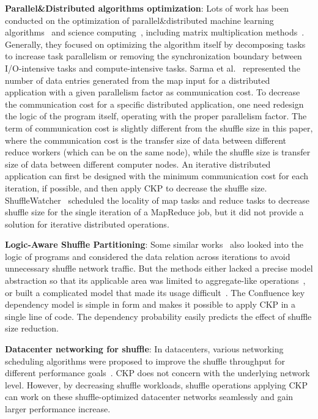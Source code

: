 \documentclass[10pt,journal,compsoc]{IEEEtran}
\begin{document}
\textbf{Parallel\&Distributed algorithms optimization}: Lots of work has been conducted on the optimization of parallel\&distributed machine learning algorithms~\cite{bekkerman2011scaling} and science computing~\cite{kiran2013verification, mensink2012metric}, including matrix multiplication methods~\cite{buluc2012parallel, ballard2012communication}. 
Generally, they focused on optimizing the algorithm itself by decomposing tasks to increase task parallelism or removing the synchronization boundary between I/O-intensive tasks and compute-intensive tasks. 
Sarma et al.~\cite{Sarma:2013:ULB} represented the number of data entries generated from the map input for a distributed application with a given parallelism factor as communication cost. 
To decrease the communication cost for a specific distributed application, one need redesign the logic of the program itself, operating with the proper parallelism factor. 
The term of communication cost is slightly different from the shuffle size in this paper, where the communication cost is the transfer size of data between different reduce workers (which can be on the same node), while the shuffle size is transfer size of data between different computer nodes. 
An iterative distributed application can first be designed with the minimum communication cost for each iteration, if possible, and then apply CKP to decrease the shuffle size.
ShuffleWatcher~\cite{faraz2014shufflewatcher} scheduled the locality of map tasks and reduce tasks to decrease shuffle size for the single 
iteration of a MapReduce job, but it did not provide a solution for iterative distributed operations. 

\textbf{Logic-Aware Shuffle Partitioning}: 
Some similar works~\cite{zhou2010scope, zhang2012shuffle} also looked into the logic of programs and considered the data relation across iterations to avoid unnecessary shuffle network traffic. 
But the methods either lacked a precise model abstraction so that 
its applicable area was limited to aggregate-like operations~\cite{zhang2012shuffle}, or built a complicated model that made its usage difficult~\cite{zhou2010scope}. The Confluence key dependency model is simple in form
and makes it possible to apply CKP in a single line of code. 
The dependency probability easily predicts the effect of 
shuffle size reduction.

\textbf{Datacenter networking for shuffle}: 
In datacenters, various networking scheduling algorithms were proposed to improve the shuffle throughput for different performance goals~\cite{greenberg2009vl2,popa2012faircloud,shieh2011sharing,chowdhury2011managing}.  
CKP does not concern with the underlying network level. However, by decreasing shuffle workloads, shuffle operations applying CKP can work on these shuffle-optimized datacenter networks seamlessly and gain larger performance increase.
\end{document}
